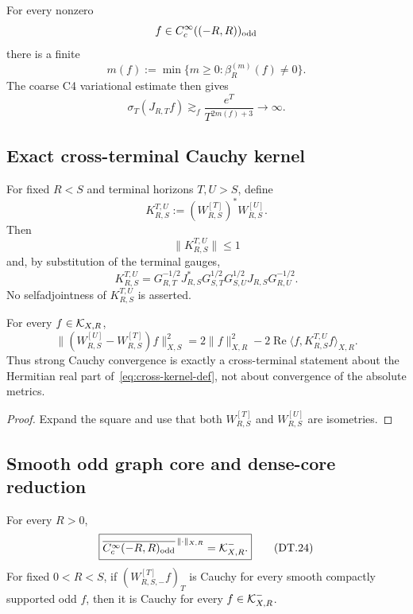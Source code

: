 \begin{corollary}\label{cor:first-jet}
For every nonzero
\[
 f\in C_c^\infty((-R,R))_{\rm odd}
\]
there is a finite
\[
 m(f):=\min\{m\ge0:\beta_R^{(m)}(f)\ne0\}.
\tag{DT.19}\label{eq:first-jet}
\]
The coarse C4 variational estimate then gives
\[
 \sigma_T(J_{R,T}f)\gtrsim_f\frac{e^T}{T^{2m(f)+3}}\to\infty.
\tag{DT.20}\label{eq:coarse-odd-divergence}
\]
\end{corollary}

\subsection{Exact cross-terminal Cauchy kernel}

For fixed $R<S$ and terminal horizons $T,U>S$, define
\[
 \boxed{
 K_{R,S}^{T,U}:=(W_{R,S}^{[T]})^*W_{R,S}^{[U]}.
 }
\tag{DT.21}\label{eq:cross-kernel-def}
\]
Then
\[
 \|K_{R,S}^{T,U}\|\le1
\]
and, by substitution of the terminal gauges,
\[
 \boxed{
 K_{R,S}^{T,U}
 =G_{R,T}^{-1/2}J_{R,S}^*
 G_{S,T}^{1/2}G_{S,U}^{1/2}J_{R,S}G_{R,U}^{-1/2}.
 }
\tag{DT.22}\label{eq:cross-kernel-formula}
\]
No selfadjointness of $K_{R,S}^{T,U}$ is asserted.

\begin{theorem}\label{thm:cross-terminal}
For every $f\in\mathcal K_{X,R}$,
\[
 \boxed{
 \|(W_{R,S}^{[U]}-W_{R,S}^{[T]})f\|_{X,S}^2
 =2\|f\|_{X,R}^2
 -2\operatorname{Re}\langle f,K_{R,S}^{T,U}f\rangle_{X,R}.
 }
\tag{DT.23}\label{eq:cross-cauchy}
\]
Thus strong Cauchy convergence is exactly a cross-terminal statement about the
Hermitian real part of~\eqref{eq:cross-kernel-def}, not about convergence of the absolute metrics.
\end{theorem}

\begin{proof}
Expand the square and use that both $W_{R,S}^{[T]}$ and $W_{R,S}^{[U]}$ are isometries.
\end{proof}

\subsection{Smooth odd graph core and dense-core reduction}

\begin{theorem}\label{thm:smooth-odd-core}
For every $R>0$,
\[
 \boxed{
 \overline{C_c^\infty(-R,R)_{\rm odd}}^{\,\|\cdot\|_{X,R}}
 =\mathcal K_{X,R}^{-}.
 }
\tag{DT.24}\label{eq:odd-core}
\]
For fixed $0<R<S$, if $(W_{R,S,-}^{[T]}f)_T$ is Cauchy for every smooth compactly
supported odd $f$, then it is Cauchy for every $f\in\mathcal K_{X,R}^{-}$.
\end{theorem}

